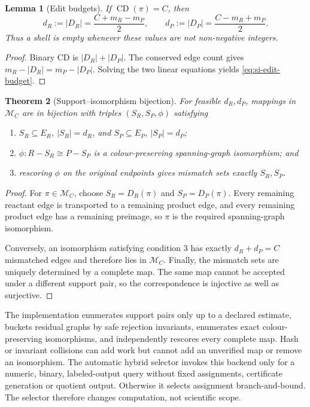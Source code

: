 \documentclass[11pt]{article}
\newtheorem{theorem}{Theorem}[section]
\newtheorem{lemma}[theorem]{Lemma}
\theoremstyle{definition}
\newcommand{\CD}{\operatorname{CD}}
\begin{document}
\begin{lemma}[Edit budgets]
If \(\CD(\pi)=C\), then
\begin{equation}
 d_R:=|D_R|=\frac{C+m_R-m_P}{2},\qquad
 d_P:=|D_P|=\frac{C-m_R+m_P}{2}.
 \label{eq:si-edit-budget}
\end{equation}
Thus a shell is empty whenever these values are not non-negative integers.
\end{lemma}

\begin{proof}
Binary CD is \(|D_R|+|D_P|\).  The conserved edge count gives
\(m_R-|D_R|=m_P-|D_P|\).  Solving the two linear equations yields
\cref{eq:si-edit-budget}.
\end{proof}

\begin{theorem}[Support--isomorphism bijection]
For feasible \(d_R,d_P\), mappings in \(\mathcal M_C\) are in bijection with
triples \((S_R,S_P,\phi)\) satisfying
\begin{enumerate}
\item \(S_R\subseteq E_R\), \(|S_R|=d_R\), and
  \(S_P\subseteq E_P\), \(|S_P|=d_P\);
\item \(\phi:R-S_R\cong P-S_P\) is a colour-preserving spanning-graph
  isomorphism; and
\item rescoring \(\phi\) on the original endpoints gives mismatch sets
  exactly \(S_R,S_P\).
\end{enumerate}
\label{thm:si-edit-support}
\end{theorem}

\begin{proof}
For \(\pi\in\mathcal M_C\), choose
\(S_R=D_R(\pi)\) and \(S_P=D_P(\pi)\).  Every remaining reactant edge is
transported to a remaining product edge, and every remaining product edge has
a remaining preimage, so \(\pi\) is the required spanning-graph isomorphism.

Conversely, an isomorphism satisfying condition 3 has exactly \(d_R+d_P=C\)
mismatched edges and therefore lies in \(\mathcal M_C\).  Finally, the
mismatch sets are uniquely determined by a complete map.  The same map cannot
be accepted under a different support pair, so the correspondence is
injective as well as surjective.
\end{proof}

The implementation enumerates support pairs only up to a declared estimate,
buckets residual graphs by safe rejection invariants, enumerates exact
colour-preserving isomorphisms, and independently rescores every complete map.
Hash or invariant collisions can add work but cannot add an unverified map or
remove an isomorphism.  The automatic hybrid selector invokes this backend
only for a numeric, binary, labeled-output query without fixed assignments,
certificate generation or quotient output.  Otherwise it selects assignment
branch-and-bound.  The selector therefore changes computation, not scientific
scope.
\end{document}
